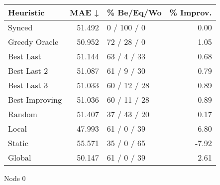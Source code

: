 \begin{tabular}{lrlr}
\toprule
\textbf{Heuristic} & \textbf{MAE ↓} & \textbf{\% Be/Eq/Wo} & \textbf{\% Improv.} \\
\midrule
            Synced &         51.492 &          0 / 100 / 0 &                0.00 \\
     Greedy Oracle &         50.952 &          72 / 28 / 0 &                1.05 \\
         Best Last &         51.144 &          63 / 4 / 33 &                0.68 \\
       Best Last 2 &         51.087 &          61 / 9 / 30 &                0.79 \\
       Best Last 3 &         51.033 &         60 / 12 / 28 &                0.89 \\
    Best Improving &         51.036 &         60 / 11 / 28 &                0.89 \\
            Random &         51.407 &         37 / 43 / 20 &                0.17 \\
             Local &         47.993 &          61 / 0 / 39 &                6.80 \\
            Static &         55.571 &          35 / 0 / 65 &               -7.92 \\
            Global &         50.147 &          61 / 0 / 39 &                2.61 \\
\bottomrule
\end{tabular}
\caption{Node 0}
\label{tab:non_lr01_le1_bs2_0}
